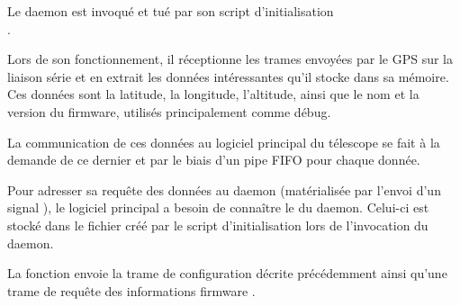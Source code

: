 \vspace{1cm}

Le daemon  est invoqué et tué par son script d'initialisation\\.

\vspace{1cm}

Lors de son fonctionnement, il réceptionne les trames envoyées par le GPS sur la liaison série et en extrait les données intéressantes qu'il stocke dans sa mémoire. Ces données sont la latitude, la longitude, l'altitude, ainsi que le nom et la version du firmware, utilisés principalement comme débug.

La communication de ces données au logiciel principal du télescope se fait à la demande de ce dernier et par le biais d'un pipe FIFO pour chaque donnée.

\vspace{1cm}

Pour adresser sa requête des données au daemon (matérialisée par l'envoi d'un signal ), le logiciel principal a besoin de connaître le  du daemon. Celui-ci est stocké dans le fichier  créé par le script d'initialisation lors de l'invocation du daemon.

\vspace{1cm}

La fonction  envoie la trame de configuration  décrite précédemment ainsi qu'une trame de requête des informations firmware .


